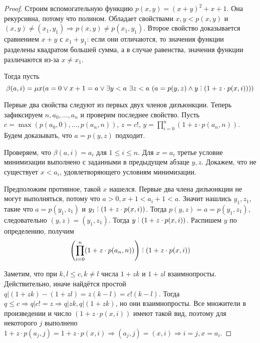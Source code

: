 \begin{proof}
    Строим вспомогательную функцию $p(x, y) = (x+y)^2+x+1$. Она рекурсивна, потому что полином. Обладает свойствами $x, y < p(x, y)$ и $(x, y)\ne (x_1, y_1) \Rightarrow p(x, y)\ne p(x_1, y_1)$. Второе свойство доказывается сравнением $x+y$ с $x_1+y_1$: если они отличаются, то значения функции разделены квадратом большей сумма, а в случае равенства, значения функции различаются из-за $x\ne x_1$.

    Тогда пусть $$\beta(a, i)=\mu x (a=0\vee x+1=a \vee \exists y<a~ \exists z<a~(a=p(y, z)\wedge y\divby(1+z\cdot p(x, i))))$$

    Первые два свойства следуют из первых двух членов дизъюнкции. Теперь зафиксируем $n, a_0, \ldots, a_n$ и проверим последнее свойство.
    Пусть $c = \max(p(a_0, 0), \ldots, p(a_n, n))$, $z = c!$, $y = \prod_{i=0}^n(1+z\cdot p(a_n, n))$. Будем доказывать, что $a = p(y, z)$ подходит.

    Проверяем, что $\beta(a, i)=a_i$ для $1\le i\le n$.  Для $x=a_i$ третье условие минимизации выполнено с заданными в предыдущем абзаце $y, z$. Докажем, что не существует $x<a_i$, удовлетворяющего условиям минимизации.

    Предположим противное, такой $x$ нашелся. Первые два члена дизъюнкции не могут выполняться, потому что $a>0, x+1<a_i+1<a$. Значит нашлись $y_1, z_1$, такие что $a = p(y_1, z_1)$ и $y_1 \divby (1+z\cdot p(x, i))$. Тогда $p(y, z) = a = p(y_1, z_1)$, следовательно $(y, z)=(y_1, z_1)$. Тогда $y\divby (1+z\cdot p(x, i))$. Распишем $y$ по определению, получим $$\left(\prod_{i=0}^n(1+z\cdot p(a_n, n))\right) \divby (1+z\cdot p(x, i))$$

    Заметим, что при $k, l\le c, k\ne l$ числа $1+zk$ и $1+zl$ взаимнопросты. Действительно, иначе найдётся простой $q | (1+zk)-(1+zl) = z(k-l) = c!(k-l)$. Тогда $q\le c \Rightarrow q | c!=z \Rightarrow q | zk, q|(1+zk)$, но они взаимнопросты. Все множители в произведении и число $(1+z\cdot p(x, i))$ имеют такой вид, поэтому для некоторого $j$ выполнено $1+z\cdot p(a_j, j)=1+z\cdot p(x, i)\Rightarrow (a_j, j)=(x, i)\Rightarrow i=j, x = a_i$.


\end{proof}
